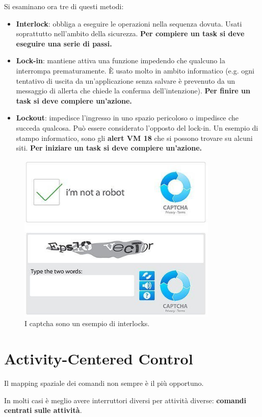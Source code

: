 \documentclass[a4paper,11pt,oneside]{book}
\begin{document}
Si esaminano ora tre di questi metodi:
\begin{itemize}
	\item \textbf{Interlock}: obbliga a eseguire le operazioni nella sequenza dovuta. Usati soprattutto nell'ambito della sicurezza. \textbf{Per compiere un task si deve eseguire una serie di passi.}
	\item \textbf{Lock-in}: mantiene attiva una funzione impedendo che qualcuno la interrompa prematuramente. È usato molto in ambito informatico (e.g. ogni tentativo di uscita da un'applicazione senza salvare è prevenuto da un messaggio di allerta che chiede la conferma dell'intenzione). \textbf{Per finire un task si deve compiere un'azione.}
	\item \textbf{Lockout}: impedisce l'ingresso in uno spazio pericoloso o impedisce che succeda qualcosa. Può essere considerato l'opposto del lock-in. Un esempio di stampo informatico, sono gli \textbf{alert VM 18} che si possono trovare su alcuni siti. \textbf{Per iniziare un task si deve compiere un'azione.}
\end{itemize}

\begin{figure}[!h]
	\centering
	\includegraphics[scale=0.4]{immagini/cap.png}
	\caption{I captcha sono un esempio di interlocks.}
\end{figure}

\section{Activity-Centered Control}
Il mapping spaziale dei comandi non sempre è il più opportuno.

In molti casi è meglio avere interruttori diversi per attività diverse: \textbf{comandi centrati sulle attività}.
\end{document}
